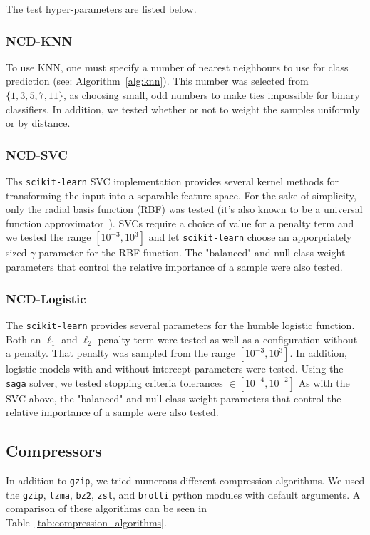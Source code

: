 \documentclass[conference]{IEEEtran}
\begin{document}
The test hyper-parameters are listed below.

\label{models}
\subsubsection{NCD-KNN}
To use KNN, one must specify a number of nearest neighbours to use for class prediction (see: Algorithm~\ref{alg:knn}). This number was selected from $\{1,3,5,7,11\}$, as choosing small, odd numbers to make ties impossible for binary classifiers. In addition, we tested whether or not to weight the samples uniformly or by distance. 

\subsubsection{NCD-SVC}
Ths \texttt{scikit-learn} SVC implementation provides several kernel methods for transforming the input into a separable feature space. 
For the sake of simplicity, only the radial basis function (RBF) was tested (it's also known to be a universal function approximator~\cite{}). 
SVCs require a choice of value for a penalty term and we tested the range $[ 10^{-3}, 10^3]$ and let \texttt{scikit-learn} choose an apporpriately sized $\gamma$ parameter for the RBF function. 
The "balanced" and null class weight parameters that control the relative importance of a sample were also tested.

\subsubsection{NCD-Logistic}
The \texttt{scikit-learn} provides several parameters for the humble logistic function. Both an $\ell_1$ and $\ell_2$ penalty term were tested as well as a configuration without a penalty. That penalty was sampled from the range $[10^{-3}, 10^3]$. In addition, logistic models with and without intercept parameters were tested. Using the \texttt{saga} solver, we tested stopping criteria tolerances $\in [10^{-4}, 10^{-2}]$
As with the SVC above, the "balanced" and null class weight parameters that control the relative importance of a sample were also tested.

\subsection{Compressors}
\label{compressors}
In addition to \texttt{gzip}, we tried numerous different compression algorithms. We used the \texttt{gzip}, \texttt{lzma}, \texttt{bz2}, \texttt{zst}, and \texttt{brotli} python modules with default arguments. A comparison of these algorithms can be seen in Table~\ref{tab:compression_algorithms}.
\end{document}
